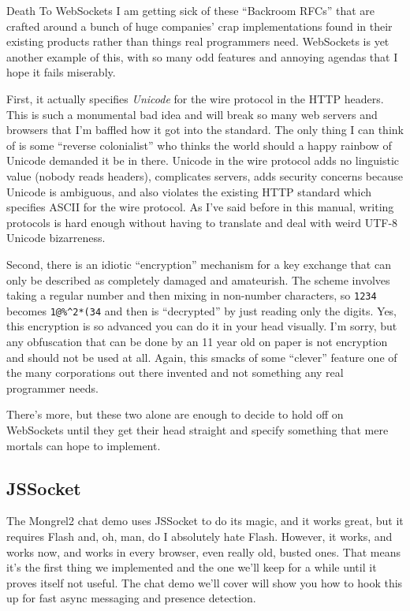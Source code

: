 \begin{aside}{Death To WebSockets}
I am getting sick of these ``Backroom RFCs'' that are crafted around a bunch of huge
companies' crap implementations found in their existing products rather than things
real programmers need.  WebSockets is yet another example of this, with so many odd
features and annoying agendas that I hope it fails miserably.

First, it actually specifies \emph{Unicode} for the wire protocol in the HTTP headers.
This is such a monumental bad idea and will break so many web servers and browsers that
I'm baffled how it got into the standard.  The only thing I can think of is some ``reverse colonialist''
who thinks the world should a happy rainbow of Unicode demanded it be in there.  Unicode in
the wire protocol adds no linguistic value (nobody reads headers), complicates servers,
adds security concerns because Unicode is ambiguous, and also violates the existing HTTP standard
which specifies ASCII for the wire protocol.  As I've said before in this manual, writing
protocols is hard enough without having to translate and deal with weird UTF-8 Unicode bizarreness.

Second, there is an idiotic ``encryption'' mechanism for a key exchange that can only be
described as completely damaged and amateurish.  The scheme involves taking a regular
number and then mixing in non-number characters, so \verb|1234| becomes \verb|1@%^2*(34| and then is
``decrypted'' by just reading only the digits.  Yes, this encryption is so advanced you can do it
in your head visually.  I'm sorry, but any obfuscation that can be done by an 11 year old on
paper is not encryption and should not be used at all.  Again, this smacks of some ``clever'' feature
one of the many corporations out there invented and not something any real programmer needs.

There's more, but these two alone are enough to decide to hold off on WebSockets until
they get their head straight and specify something that mere mortals can hope to implement.
\end{aside}

\subsection{JSSocket}

The Mongrel2 chat demo uses JSSocket to do its magic, and it works great, but it requires
Flash and, oh, man, do I absolutely hate Flash.  However, it works, and works now, and works in every
browser, even really old, busted ones.  That means it's the first thing we implemented and
the one we'll keep for a while until it proves itself not useful.  The chat demo we'll
cover will show you how to hook this up for fast async messaging and presence detection.


